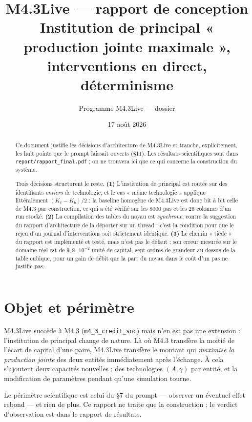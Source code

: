 \documentclass[11pt,a4paper]{article}
\title{M4.3Live --- rapport de conception\\
\large Institution de principal « production jointe maximale »,
interventions en direct, déterminisme}
\author{Programme M4.3Live --- dossier \code{m4\_3live\_credit\_soc}}
\date{17 août 2026}
\newcommand{\code}[1]{\texttt{#1}}
\begin{document}
\maketitle

\begin{abstract}
Ce document justifie les décisions d'architecture de M4.3Live et tranche,
explicitement, les huit points que le prompt laissait ouverts (§11). Les
résultats scientifiques sont dans \code{report/rapport\_final.pdf} ; on ne
trouvera ici que ce qui concerne la construction du système.

Trois décisions structurent le reste. \textbf{(1)} L'institution de
principal est routée sur des identifiants \emph{entiers} de technologie,
et le cas « même technologie » applique littéralement $(K_\ell-K_b)/2$ :
la baseline homogène de M4.3Live est donc bit à bit celle de M4.3 par
construction, ce qui a été vérifié sur les 8000 pas et les 26 colonnes
d'un run stocké. \textbf{(2)} La compilation des tables du noyau est
\emph{synchrone}, contre la suggestion du rapport d'architecture de la
déporter sur un thread : c'est la condition pour que le rejeu d'un journal
d'interventions soit strictement identique. \textbf{(3)} Le chemin
« tiède » du rapport est implémenté et testé, mais n'est pas le défaut :
son erreur mesurée sur le domaine réel est de $9{,}8\cdot10^{-2}$ unité de
capital, sept ordres de grandeur au-dessus de la table cubique, pour un
gain de débit que la part du noyau dans le coût d'un pas ne justifie pas.
\end{abstract}

\tableofcontents



\section{Objet et périmètre}

M4.3Live succède à M4.3 (\code{m4\_3\_credit\_soc}) mais n'en est pas une
extension : l'institution de principal change de nature. Là où M4.3
transfère la moitié de l'écart de capital d'une paire, M4.3Live transfère
le montant qui \emph{maximise la production jointe} des deux entités
immédiatement après l'échange. À cela s'ajoutent deux capacités
nouvelles : des technologies $(A,\gamma)$ par entité, et la modification
de paramètres pendant qu'une simulation tourne.

Le périmètre scientifique est celui du §7 du prompt --- observer un
éventuel effet rebond --- et rien de plus. Ce rapport ne traite que la
construction ; le verdict d'observation est dans le rapport de résultats.
\end{document}
